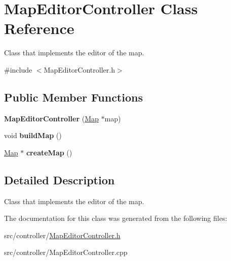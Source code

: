 \hypertarget{classMapEditorController}{}\section{Map\+Editor\+Controller Class Reference}
\label{classMapEditorController}


Class that implements the editor of the map.  




{\ttfamily \#include $<$Map\+Editor\+Controller.\+h$>$}

\subsection*{Public Member Functions}
\begin{DoxyCompactItemize}
\item 
\hypertarget{classMapEditorController_a417086a846a4c2d470fd509f8701b736}{}\label{classMapEditorController_a417086a846a4c2d470fd509f8701b736} 
{\bfseries Map\+Editor\+Controller} (\hyperlink{classMap}{Map} $\ast$map)
\item 
\hypertarget{classMapEditorController_afe2d87da8000de0321d52103b75ddfc1}{}\label{classMapEditorController_afe2d87da8000de0321d52103b75ddfc1} 
void {\bfseries build\+Map} ()
\item 
\hypertarget{classMapEditorController_a55ea0d1c4f99a9d7903a66e4bb8a6dab}{}\label{classMapEditorController_a55ea0d1c4f99a9d7903a66e4bb8a6dab} 
\hyperlink{classMap}{Map} $\ast$ {\bfseries create\+Map} ()
\end{DoxyCompactItemize}


\subsection{Detailed Description}
Class that implements the editor of the map. 

The documentation for this class was generated from the following files\+:\begin{DoxyCompactItemize}
\item 
src/controller/\hyperlink{MapEditorController_8h}{Map\+Editor\+Controller.\+h}\item 
src/controller/Map\+Editor\+Controller.\+cpp\end{DoxyCompactItemize}
